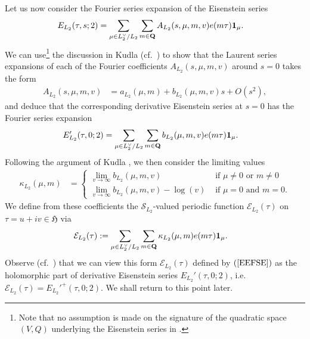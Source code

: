 \documentclass{amsart}
\theoremstyle{definition}
\begin{document}
Let us now consider the Fourier series expansion of the Eisenstein series 
\begin{align*}  E_{L_2}(\tau, s; 2)
&= \sum\limits_{\mu \in L_2^{\vee}/L_2} \sum_{m \in {\bf{Q}}} A_{L_2}(s, \mu, m, v) e(m \tau) {\bf{1}}_{\mu}. \end{align*}
We can use\footnote{Note that no assumption is made on the signature of the quadratic space $(V, Q)$ underlying 
the Eisenstein series in \cite[$\S 4$]{KuBL}.} the discussion in Kudla \cite[$\S 2$]{KuBL} (cf.~\cite[$\S$ 2.2]{BY}) 
to show that the Laurent series expansions of each of the 
Fourier coefficients $A_{L_2}(s, \mu, m, v)$ around $s = 0$ takes the form 
\begin{align}\label{LSE} A_{L_2}(s, \mu, m, v) &= a_{L_2}(\mu, m) +
b_{L_2}(\mu, m, v) s + O\left( s^2 \right), \end{align}
and deduce that the corresponding derivative Eisenstein series at $s=0$ has the Fourier series expansion
\begin{equation}\begin{aligned}\label{EFSE}  E_{L_2}'(\tau, 0; 2) 
&=\sum\limits_{\mu \in L_2^{\vee}/L_2} \sum_{m \in {\bf{Q}}} b_{L_2}(\mu, m, v) e(m \tau) {\bf{1}}_{\mu}. \end{aligned}\end{equation}
Following the argument of Kudla \cite[Theorem 2.12]{KuBL}, we then consider the limiting values 
\begin{align}\label{kappa} \kappa_{L_2}(\mu, m) &= \begin{cases}
\lim_{v \rightarrow \infty} b_{L_2}(\mu, m, v) &\text{ if $\mu \neq 0$ or $m \neq 0$} \\
\lim_{v \rightarrow \infty} b_{L_2}(\mu, m, v) - \log(v) &\text{ if $\mu = 0$ and $m = 0$}.  \end{cases} \end{align}
We define from these coefficients the $\mathcal{S}_{L_2}$-valued 
periodic function $\mathcal{E}_{L_2}(\tau)$ on $\tau = u + iv \in \mathfrak{H}$ via 
\begin{align}\label{EEFSE} \mathcal{E}_{L_2}(\tau) 
&:= \sum\limits_{\mu \in L_2^{\vee}/ L_2} \sum\limits_{m \in {\bf{Q}}} 
\kappa_{L_2}(\mu, m) e(m \tau) {\bf{1}}_{\mu}. \end{align}
Observe (cf.~\cite[Remark 2.4, (3.5)]{BY}) that we can view this form $\mathcal{E}_{L_2}(\tau)$ defined by $(\ref{EEFSE})$ as the holomorphic 
part of derivative Eisenstein series $E_{L_2}'(\tau, 0; 2)$, i.e.~$\mathcal{E}_{L_2}(\tau) =  E_{L_2}'^+(\tau, 0; 2)$. We shall return to this point later.
\end{document}
